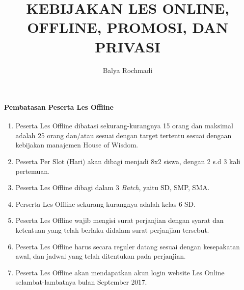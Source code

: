 \documentclass[12pt,a4paper]{article}
\author{Balya Rochmadi}
\title{KEBIJAKAN LES ONLINE, OFFLINE, PROMOSI, DAN PRIVASI}
\begin{document}
	\maketitle
	\paragraph{Pembatasan Peserta Les Offline}
		\begin{enumerate}
			\item Peserta Les Offline dibatasi sekurang-kurangnya 15 orang dan maksimal adalah 25 orang dan/atau sesuai dengan target tertentu sesuai dengaan kebijakan manajemen House of Wisdom.
			\item Peserta Per Slot (Hari) akan dibagi menjadi 8x2 siswa, dengan 2 s.d 3 kali pertemuan.
			\item Peserta Les Offline dibagi dalam 3 \textit{Batch}, yaitu SD, SMP, SMA.
			\item Perserta Les Offline sekurang-kurangnya adalah kelas 6 SD.
			\item Peserta Les Offline wajib mengisi surat perjanjian dengan syarat dan ketentuan yang telah berlaku didalam surat perjanjian tersebut.
			\item Peserta Les Offline harus secara reguler datang sesuai dengan kesepakatan awal, dan jadwal yang telah ditentukan pada perjanjian.
			\item Peserta Les Offline akan mendapatkan akun login website Les Online selambat-lambatnya bulan September 2017. 
			
		\end{enumerate}
		
\end{document}

